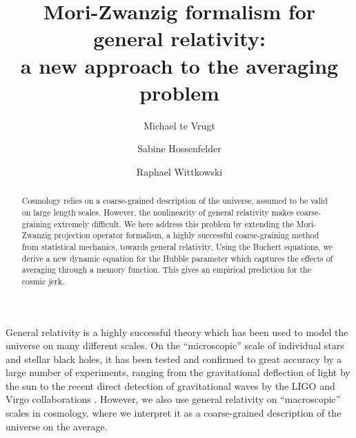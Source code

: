 \documentclass[aps,prl,11pt,nofootinbib]{revtex4-1}
\newcommand{\ZT}[1]{\textquotedblleft#1\textquotedblright}%
\begin{document}
\title{Mori-Zwanzig formalism for general relativity:\\a new approach to the averaging problem}


\author{Michael te Vrugt}

\author{Sabine Hossenfelder}

\author{Raphael Wittkowski}


\begin{abstract}
Cosmology relies on a coarse-grained description of the universe, assumed to be valid on large length scales. However, the nonlinearity of general relativity makes coarse-graining extremely difficult. We here address this problem by extending the Mori-Zwanzig projection operator formalism, a highly successful coarse-graining method from statistical mechanics, towards general relativity. Using the Buchert equations, we derive a new dynamic equation for the Hubble parameter which captures the effects of averaging through a memory function. This gives an empirical prediction for the cosmic jerk.
\end{abstract}

\maketitle

\newpage

General relativity \cite{Einstein1914,Einstein1915b,Einstein1916} is a highly successful theory which has been used to model the universe on many different scales. On the \ZT{microscopic} scale of individual stars and stellar black holes, it has been tested and confirmed to great accuracy by a large number of experiments, ranging from the gravitational deflection of light by the sun \cite{DysonED1920} to the recent direct detection of gravitational waves by the LIGO and Virgo collaborations \cite{Abbott2016,Abbott2016b}. However, we also use general relativity on \ZT{macroscopic} scales in cosmology, where we interpret it as a coarse-grained description of the universe on the average. 
\end{document}
